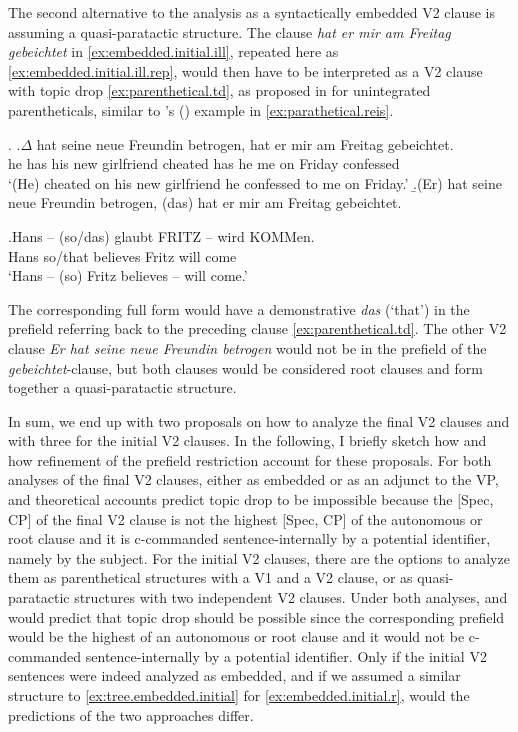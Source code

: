 The second alternative to the analysis as a syntactically embedded V2 clause is assuming a quasi-paratactic structure.
The clause \textit{hat er mir am Freitag gebeichtet} in \ref{ex:embedded.initial.ill}, repeated here as \ref{ex:embedded.initial.ill.rep}, would then have to be interpreted as a V2 clause with topic drop \ref{ex:parenthetical.td}, as proposed in \citet{reis1995,reis1996} for unintegrated parentheticals, similar to \citeauthor{reis1995}'s (\citeyear[66]{reis1995}) example in \ref{ex:parathetical.reis}.

\ex.
\ag.\label{ex:embedded.initial.ill.rep}$\Delta$ hat seine neue Freundin betrogen, hat er mir am Freitag gebeichtet.\\
he has his new girlfriend cheated has he me on Friday confessed\\
`(He) cheated on his new girlfriend he confessed to me on Friday.'
\b.\label{ex:parenthetical.td}(Er) hat seine neue Freundin betrogen, (das) hat er mir am Freitag gebeichtet.

\exg.\label{ex:parathetical.reis}Hans -- (so/das) glaubt FRITZ -- wird KOMMen.\\
Hans {} so/that believes Fritz {} will come\\
`Hans -- (so) Fritz believes -- will come.' \citep[66]{reis1995}

The corresponding full form would have a demonstrative \textit{das} (`that') in the prefield referring back to the preceding clause \ref{ex:parenthetical.td}.
The other V2 clause \textit{Er hat seine neue Freundin betrogen} would not be in the prefield of the \textit{gebeichtet}-clause, but both clauses would be considered root clauses and form together a quasi-paratactic structure.

In sum, we end up with two proposals on how to analyze the final V2 clauses and with three for the initial V2 clauses.
In the following, I briefly sketch how  and how  refinement of the prefield restriction account for these proposals.
For both analyses of the final V2 clauses, either as embedded or as an adjunct  to the VP,   and  theoretical accounts predict topic drop to be impossible because the [Spec, CP] of the final V2 clause is not the highest [Spec, CP] of the autonomous or root clause and it is c-commanded  sentence-internally by a potential identifier, namely by the subject.
For the initial V2 clauses, there are the options to analyze them as parenthetical structures with a V1 and a V2 clause, or as quasi-paratactic structures with two independent V2 clauses.
Under both analyses, \citet{rizzi1994} and \citet{freywald2020} would predict that topic drop should be possible since the corresponding prefield would be the highest of an autonomous or root clause and it would not be c-commanded  sentence-internally by a potential identifier.
Only if the initial V2 sentences were indeed analyzed as embedded, and if we assumed a similar structure to \ref{ex:tree.embedded.initial} for \ref{ex:embedded.initial.r}, would the predictions of the two approaches differ.

